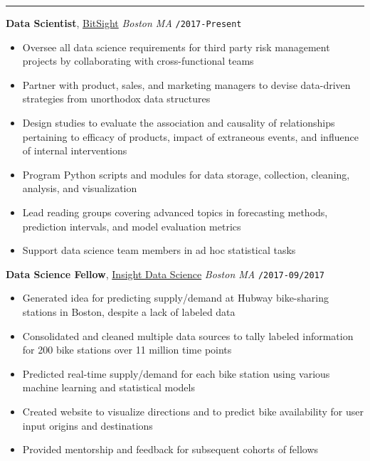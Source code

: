 \documentclass[10pt,english]{report}
\begin{document}
{}
\vspace{1mm}\hrule
\vspace{2mm}

\textbf{Data Scientist}, \textcolor{blue}{\href{https://www.bitsight.com}{BitSight}} \hfill \textit{Boston MA} \texttt{/2017-Present}
\vspace{1mm}
\begin{itemize}
\item Oversee all data science requirements for third party risk management projects by collaborating with cross-functional teams
\item Partner with product, sales, and marketing managers to devise data-driven strategies from unorthodox data structures
\item Design studies to evaluate the association and causality of relationships pertaining to efficacy of products, impact of extraneous events, and influence of internal interventions
\item Program Python scripts and modules for data storage, collection, cleaning, analysis, and visualization
\item Lead reading groups covering advanced topics in forecasting methods, prediction intervals, and model evaluation metrics
\item Support data science team members in ad hoc statistical tasks
\end{itemize}

\vspace{1mm}

\textbf{Data Science Fellow}, \textcolor{blue}{\href{https://www.insightdatascience.com}{Insight Data Science}} \hfill \textit{Boston MA} \texttt{/2017-09/2017}
\begin{itemize}
\item Generated idea for predicting supply/demand at Hubway bike-sharing stations in Boston, despite a lack of labeled data
\item Consolidated and cleaned multiple data sources to tally labeled information for 200 bike stations over 11 million time points
\item Predicted real-time supply/demand for each bike station using various machine learning and statistical models
\item Created website to visualize directions and to predict bike availability for user input origins and destinations
\item Provided mentorship and feedback for subsequent cohorts of fellows
\end{itemize}
\end{document}
